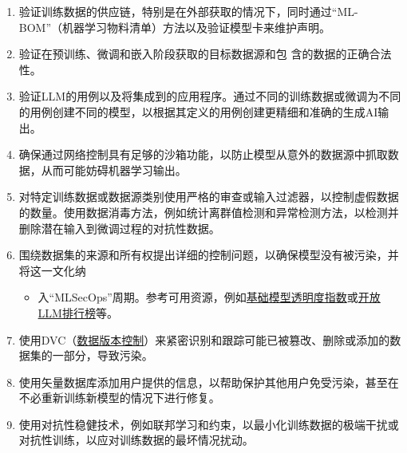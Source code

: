 \documentclass[
]{article}
\providecommand{\tightlist}{%
  \setlength{\itemsep}{0pt}\setlength{\parskip}{0pt}}
\begin{document}
\begin{enumerate}
\def\labelenumi{\arabic{enumi}.}
\tightlist
\item
  验证训练数据的供应链，特别是在外部获取的情况下，同时通过``ML-BOM''（机器学习物料清单）方法以及验证模型卡来维护声明。
\item
  验证在预训练、微调和嵌入阶段获取的目标数据源和包
  含的数据的正确合法性。
\item
  验证LLM的用例以及将集成到的应用程序。通过不同的训练数据或微调为不同的用例创建不同的模型，以根据其定义的用例创建更精细和准确的生成AI输出。
\item
  确保通过网络控制具有足够的沙箱功能，以防止模型从意外的数据源中抓取数据，从而可能妨碍机器学习输出。
\item
  对特定训练数据或数据源类别使用严格的审查或输入过滤器，以控制虚假数据的数量。使用数据消毒方法，例如统计离群值检测和异常检测方法，以检测并删除潜在输入到微调过程的对抗性数据。
\item
  围绕数据集的来源和所有权提出详细的控制问题，以确保模型没有被污染，并将这一文化纳

  \begin{itemize}
  \tightlist
  \item
    入``MLSecOps''周期。参考可用资源，例如\href{https://crfm.stanford.edu/fmti/}{基础模型透明度指数}或\href{https://huggingface.co/spaces/HuggingFaceH4/open_llm_leaderboard}{开放LLM排行榜}等。
  \end{itemize}
\item
  使用DVC（\href{https://dvc.org/doc/user-guide/analytics}{数据版本控制}）来紧密识别和跟踪可能已被篡改、删除或添加的数据集的一部分，导致污染。
\item
  使用矢量数据库添加用户提供的信息，以帮助保护其他用户免受污染，甚至在不必重新训练新模型的情况下进行修复。
\item
  使用对抗性稳健技术，例如联邦学习和约束，以最小化训练数据的极端干扰或对抗性训练，以应对训练数据的最坏情况扰动。


\end{enumerate}
\end{document}
